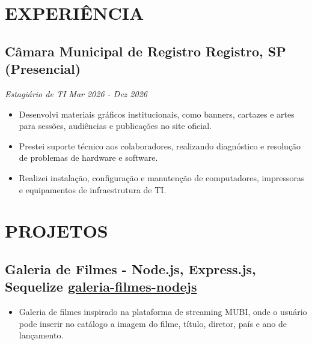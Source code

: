 \documentclass[a4paper,10pt]{article}
\begin{document}

\section{EXPERIÊNCIA }
    \subsection*{\texorpdfstring{
            \textbf{Câmara Municipal de Registro} \hfill Registro, SP (Presencial)
        }{
            Câmara Municipal de Registro -- Registro, SP (Presencial)
        }}
    \textit{Estagiário de TI  \hfill Mar 2026 - Dez 2026}
        \begin{itemize} 
            \item Desenvolvi materiais gráficos institucionais, como banners, cartazes e artes para sessões, audiências e publicações no site oficial.
            \item Prestei suporte técnico aos colaboradores, realizando diagnóstico e resolução de problemas de hardware e software.
            \item Realizei instalação, configuração e manutenção de computadores, impressoras e equipamentos de infraestrutura de TI.
        \end{itemize}

\section{PROJETOS}
    \subsection*{\textbf{Galeria de Filmes - Node.js, Express.js, Sequelize} \hfill \href{https://github.com/amandafralve/galeria-filmes-nodejs}{galeria-filmes-nodejs}}  
        \begin{itemize} 
            \item Galeria de filmes inspirado
            na plataforma de streaming MUBI, onde o usuário pode inserir no catálogo a 
            imagem do filme, título, diretor, país e ano de lançamento.
            
        \end{itemize}
    
\end{document}
